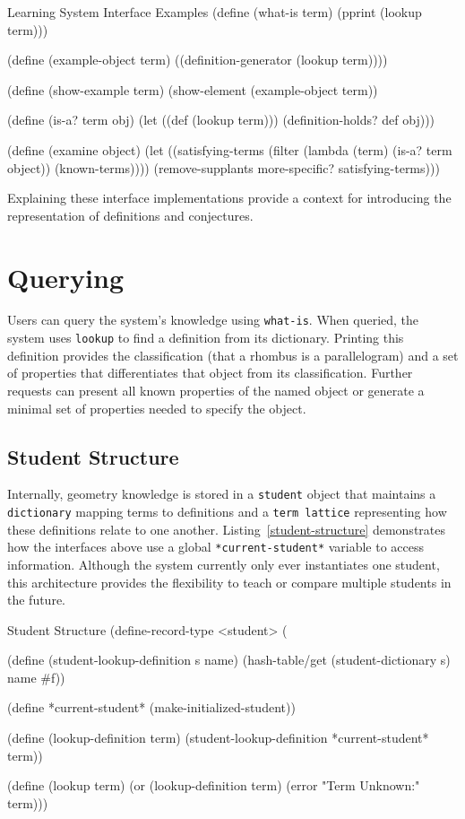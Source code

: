 \begin{code-example}
[label=l-interface]
{Learning System Interface Examples}
(define (what-is term)
  (pprint (lookup term)))

(define (example-object term)
  ((definition-generator (lookup term))))

(define (show-example term)
    (show-element (example-object term))

(define (is-a? term obj)
  (let ((def (lookup term)))
    (definition-holds? def obj)))

(define (examine object)
  (let ((satisfying-terms
         (filter (lambda (term) (is-a? term object))
           (known-terms))))
    (remove-supplants more-specific? satisfying-terms)))
\end{code-example}

Explaining these interface implementations provide a context for
introducing the representation of definitions and conjectures.
\enlargethispage*{\baselineskip}

\section{Querying}

Users can query the system's knowledge using \texttt{what-is}. When
queried, the system uses \texttt{lookup} to find a definition from its
dictionary. Printing this definition provides the classification (that
a rhombus is a parallelogram) and a set of properties that
differentiates that object from its classification. Further requests
can present all known properties of the named object or generate a
minimal set of properties needed to specify the object.

\subsection{Student Structure}

Internally, geometry knowledge is stored in a \texttt{student} object
that maintains a \texttt{dictionary} mapping terms to definitions and
a \texttt{term lattice} representing how these definitions relate to
one another. Listing~\ref{student-structure} demonstrates how the
interfaces above use a global \texttt{*current-student*} variable to
access information. Although the system currently only ever
instantiates one student, this architecture provides the flexibility
to teach or compare multiple students in the future.

\begin{code-listing}
[label=student-structure]
{Student Structure}
(define-record-type <student>
  (%

(define (student-lookup-definition s name)
  (hash-table/get (student-dictionary s) name #f))

(define *current-student* (make-initialized-student))

(define (lookup-definition term)
  (student-lookup-definition *current-student* term))

(define (lookup term)
  (or (lookup-definition term) (error "Term Unknown:" term)))
\end{code-listing}

